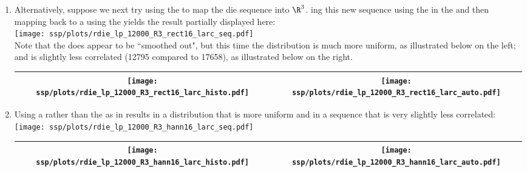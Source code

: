 \begin{example}
\begin{enumerate}
  \item \label{item:rdie_lp_R3_rect16_larc}
        Alternatively, suppose we next try
        using the  
        to map the die sequence into $\R^3$.
        ing %
        this new sequence using the 
        in the   
        and then mapping back to a  %
        using the  yields the result partially displayed here:
        \\\texttt{[image: ssp/plots/rdie\_lp\_12000\_R3\_rect16\_larc\_seq.pdf]}\\
        Note that the  does appear to be ``smoothed out", 
        but this time the distribution is much more uniform, as illustrated below on the left;
        and is slightly less correlated (12795 compared to 17658), as illustrated below on the right.
     \\\begin{tabular}{|>{\scs}c|>{\scs}c|}
          \hline
          \texttt{[image: ssp/plots/rdie\_lp\_12000\_R3\_rect16\_larc\_histo.pdf]}%
         &\texttt{[image: ssp/plots/rdie\_lp\_12000\_R3\_rect16\_larc\_auto.pdf]}
        \\\hline
     \end{tabular}
        

  \item \label{item:rdie_lp_R3_hann16_larc}
        Using a  
        rather than the  as in 
        results in a distribution that is more uniform and in a sequence that is very slightly less correlated:
        \\\texttt{[image: ssp/plots/rdie\_lp\_12000\_R3\_hann16\_larc\_seq.pdf]}
     \\\begin{tabular}{|>{\scs}c|>{\scs}c|}
          \hline
          \texttt{[image: ssp/plots/rdie\_lp\_12000\_R3\_hann16\_larc\_histo.pdf]}%
         &\texttt{[image: ssp/plots/rdie\_lp\_12000\_R3\_hann16\_larc\_auto.pdf]}
        \\\hline
     \end{tabular}


\end{enumerate}
\end{example}
